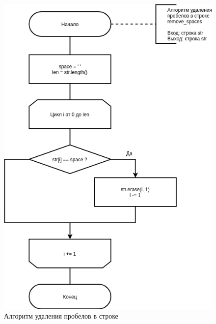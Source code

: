 \begin{figure}[H]
	\begin{center}
		\includegraphics[scale=0.6]{img/spaces.png}
	\end{center}
	\captionsetup{justification=centering}
	\caption{Алгоритм удаления пробелов в строке}
	\label{img:spaces}
\end{figure}


